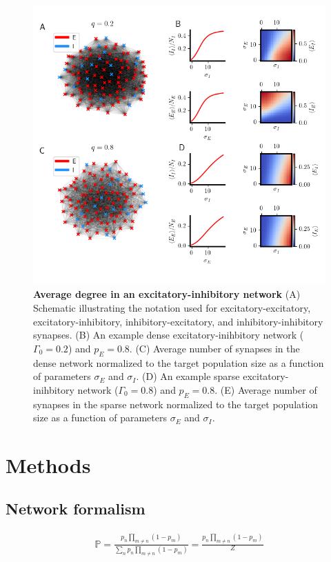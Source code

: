 \documentclass{ucetd}
\begin{document}
\clearpage
\begin{figure}[t!]
\centering
\includegraphics[width=165mm]{fig_10}
\caption{\textbf{Average degree in an excitatory-inhibitory network} (A) Schematic illustrating the notation used for excitatory-excitatory, excitatory-inhibitory, inhibitory-excitatory, and inhibitory-inhibitory synapses. (B) An example dense excitatory-inihbitory network ($\Gamma_{0}=0.2$) and $p_{E} = 0.8$. (C) Average number of synapses in the dense network normalized to the target population size as a function of parameters $\sigma_{E}$ and $\sigma_{I}$. (D) An example sparse excitatory-inihbitory network ($\Gamma_{0}=0.8$) and $p_{E} = 0.8$. (E) Average number of synapses in the sparse network normalized to the target population size as a function of parameters $\sigma_{E}$ and $\sigma_{I}$.}
\end{figure}


\section{Methods}


\subsection{Network formalism}

\begin{align}
\mathbb{P} = \frac{p_{n}\prod_{m\neq n}(1-p_{m})}{\sum_{n}p_{n}\prod_{m\neq n}(1-p_{m})} = \frac{p_{n}\prod_{m\neq n}(1-p_{m})}{Z}
\end{align}
\end{document}
